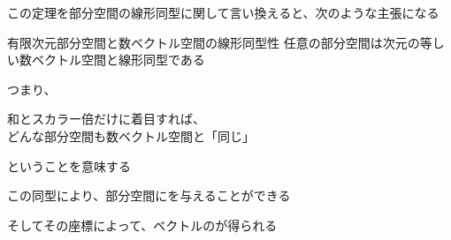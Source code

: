 \documentclass[../../../topic_linear-algebra]{subfiles}
\begin{document}
この定理を部分空間の線形同型に関して言い換えると、次のような主張になる

\begin{theorem}{有限次元部分空間と数ベクトル空間の線形同型性}\label{thm:subspace-isomorphic-to-Kn}
  任意の部分空間は次元の等しい数ベクトル空間と線形同型である
\end{theorem}

つまり、
\begin{shaded}
  和とスカラー倍だけに着目すれば、\\
  どんな部分空間も数ベクトル空間と「同じ」
\end{shaded}
ということを意味する

\br

この同型により、部分空間にを与えることができる

そしてその座標によって、ベクトルのが得られる
\end{document}

